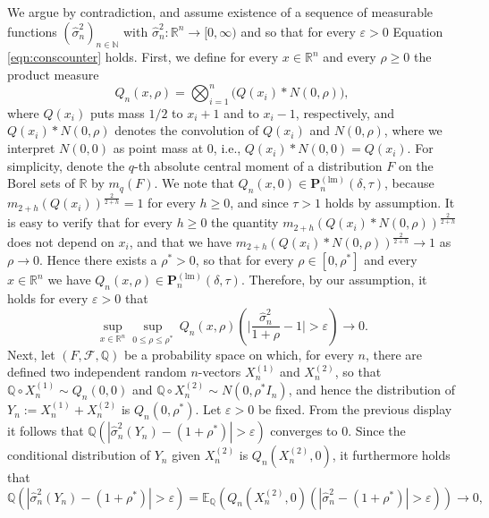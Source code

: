 \documentclass[preprint]{imsart}
\newcommand{\R}{{\mathbb R}}
\numberwithin{equation}{section}
\begin{document}
We argue by contradiction, and assume existence of a sequence of measurable functions $(\hat{\sigma}^2_{n})_{n \in \mathbb{N}}$  with $\hat{\sigma}^2_{n}: \mathbb{R}^n \to [0, \infty)$ and so that for every $\varepsilon > 0$ Equation \eqref{eqn:conscounter} holds. First, we define for every $x \in \mathbb{R}^n$ and every $\rho \geq 0$  the product measure
%
\begin{equation}
Q_n(x, \rho) = \bigotimes_{i = 1}^n \bigg( Q(x_i) \ast N(0, \rho)\bigg),
\end{equation}
%
where $Q(x_i)$ puts mass $1/2$ to $x_i + 1$ and to $x_i - 1$, respectively, and $Q(x_i) \ast N(0, \rho)$ denotes the convolution of $Q(x_i)$ and $N(0, \rho)$, where we interpret $N(0, 0)$ as point mass at $0$, i.e., $Q(x_i) \ast N(0, 0) = Q(x_i)$. For simplicity, denote the $q$-th absolute central moment of a distribution $F$ on the Borel sets of $\R$ by $m_q(F)$. We note that $Q_n(x, 0) \in \mathbf{P}_n^{(\mathrm{lm})}(\delta, \tau)$, because $m_{2+h}( Q(x_i))^{\frac{2}{2+h}} = 1$ for every $h \geq 0$, and since $\tau > 1$ holds by assumption. It is easy to verify that for every $h \geq 0$ the quantity $m_{2+h}( Q(x_i)  \ast N(0, \rho) )^{\frac{2}{2+h}}$ does not depend on $x_i$, and that we have $m_{2+h}( Q(x_i)  \ast N(0, \rho) )^{\frac{2}{2+h}} \to 1$ as $\rho \to 0$. Hence there exists a $\rho^* > 0$, so that for every $\rho \in[0,\rho^*]$ and every $x \in \mathbb{R}^n$ we have $Q_n(x, \rho) \in \mathbf{P}_n^{(\mathrm{lm})}(\delta, \tau)$. Therefore, by our assumption, it holds for every $\varepsilon > 0$ that
%
\begin{equation}\label{eqn:contra}
\sup_{x \in \mathbb{R}^n}  \sup_{0 \leq \rho \le \rho^*} ~ Q_n(x, \rho) \left( \bigg | \frac{\hat{\sigma}^2_n}{1 + \rho} - 1 \bigg | > \varepsilon \right) \to 0.
\end{equation}
%
Next, let $(F, \mathcal{F}, \mathbb{Q})$ be a probability space on which, for every $n$, there are defined two independent random $n$-vectors $X_n^{(1)}$ and $X_n^{(2)}$, so that $\mathbb{Q}
\circ X_n^{(1)} \sim Q_n(0, 0)$ and $\mathbb{Q}
\circ X_n^{(2)} \sim N(0, \rho^*I_n)$, and hence the distribution of $Y_n := X_n^{(1)} + X_n^{(2)}$ is $Q_n(0, \rho^*)$. Let $\varepsilon > 0$ be fixed. From the previous display it follows that $\mathbb{Q}(|\hat{\sigma}^2_n(Y_n) - (1 + \rho^*)  | > \varepsilon )$ converges to $0$. Since the conditional distribution of $Y_n$ given $X_n^{(2)}$ is $Q_n(X_n^{(2)}, 0)$, it furthermore holds that
%
\begin{equation}
\mathbb{Q}(|\hat{\sigma}^2_n(Y_n) - (1 + \rho^*)  | > \varepsilon ) = \mathbb{E}_{\mathbb{Q}} \left( Q_n(X_n^{(2)}, 0)(|\hat{\sigma}^2_n - (1 + \rho^*)  | > \varepsilon )\right) \to 0,
\end{equation}
\end{document}
